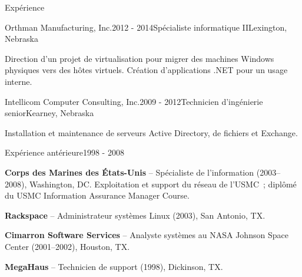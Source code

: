 \documentclass{resume} %
\begin{document}
\begin{rSection}{Exp\'erience}
\begin{rSubsection}{Orthman Manufacturing, Inc.}{2012 - 2014}{Sp\'ecialiste informatique II}{Lexington, Nebraska}
\item Direction d'un projet de virtualisation pour migrer des machines Windows physiques vers des h\^otes virtuels. Cr\'eation d'applications .NET pour un usage interne.
\end{rSubsection}

\begin{rSubsection}{Intellicom Computer Consulting, Inc.}{2009 - 2012}{Technicien d'ing\'enierie senior}{Kearney, Nebraska}
\item Installation et maintenance de serveurs Active Directory, de fichiers et Exchange. 
\end{rSubsection}

\begin{rSubsection}{Exp\'erience ant\'erieure}{1998 - 2008}{}{}
\item {\bf Corps des Marines des \'Etats-Unis} -- Sp\'ecialiste de l'information (2003--2008), Washington, DC. Exploitation et support du r\'eseau de l'USMC~; dipl\^om\'e du USMC Information Assurance Manager Course.
\item {\bf Rackspace} -- Administrateur syst\`emes Linux (2003), San Antonio, TX.
\item {\bf Cimarron Software Services} -- Analyste syst\`emes au NASA Johnson Space Center (2001--2002), Houston, TX.
\item {\bf MegaHaus} -- Technicien de support (1998), Dickinson, TX.
\end{rSubsection}

\end{rSection}

\end{document}
